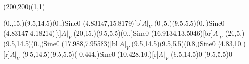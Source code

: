 \unitlength=1bp%

\begin{feynartspicture}(200,200)(1,1)

\FADiagram{}
\FAProp(0.,15.)(9.5,14.5)(0.,){Sine}{0}
\FALabel(4.83147,15.8179)[b]{$A|_V$}
\FAProp(0.,5.)(9.5,5.5)(0.,){Sine}{0}
\FALabel(4.83147,4.18214)[t]{$A|_V$}
\FAProp(20,15.)(9.5,5.5)(0.,){Sine}{0}
\FALabel(16.9134,13.5046)[br]{$A|_V$}
\FAProp(20,5.)(9.5,14.5)(0.,){Sine}{0}
\FALabel(17.988,7.95583)[bl]{$A|_V$}
\FAProp(9.5,14.5)(9.5,5.5)(0.8,){Sine}{0}
\FALabel(4.83,10.)[r]{$A|_V$}
\FAProp(9.5,14.5)(9.5,5.5)(-0.444,){Sine}{0}
\FALabel(10.428,10.)[r]{$A|_V$}
\FAVert(9.5,14.5){0}
\FAVert(9.5,5.5){0}
\end{feynartspicture}

